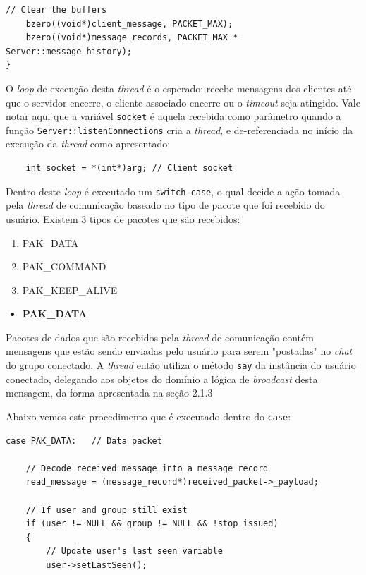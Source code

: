 \documentclass{article}
\begin{document}
\begin{itemize}
\begin{lstlisting}[xleftmargin=-.2\textwidth, xrightmargin=-.2\textwidth]
    // Clear the buffers
    bzero((void*)client_message, PACKET_MAX);
    bzero((void*)message_records, PACKET_MAX * Server::message_history);
}
\end{lstlisting}
\par O \textit{loop} de execução desta \textit{thread} é o esperado: recebe mensagens dos clientes até que o servidor encerre, o cliente associado encerre ou o \textit{timeout} seja atingido. Vale notar aqui que a variável \texttt{socket} é aquela recebida como parâmetro quando a função \texttt{Server::listenConnections} cria a \textit{thread}, e de-referenciada no início da execução da \textit{thread} como apresentado:
\begin{lstlisting}
    int socket = *(int*)arg; // Client socket
\end{lstlisting}
\par Dentro deste \textit{loop} é executado um \texttt{switch-case}, o qual decide a ação tomada pela \textit{thread} de comunicação baseado no tipo de pacote que foi recebido do usuário. Existem 3 tipos de pacotes que são recebidos:
\begin{enumerate}
    \item PAK\_DATA
    \item PAK\_COMMAND
    \item PAK\_KEEP\_ALIVE
\end{enumerate}
%
\begin{itemize}
    \item \textbf{PAK\_DATA}
\end{itemize}
\par Pacotes de dados que são recebidos pela \textit{thread} de comunicação contém mensagens que estão sendo enviadas pelo usuário para serem "postadas" no \textit{chat} do grupo conectado. A \textit{thread} então utiliza o método \texttt{say} da instância do usuário conectado, delegando aos objetos do domínio a lógica de \textit{broadcast} desta mensagem, da forma apresentada na seção 2.1.3
\par Abaixo vemos este procedimento que é executado dentro do \texttt{case}:
\begin{lstlisting}[xleftmargin=-.1\textwidth, xrightmargin=-.1\textwidth]
case PAK_DATA:   // Data packet

    // Decode received message into a message record
    read_message = (message_record*)received_packet->_payload;

    // If user and group still exist
    if (user != NULL && group != NULL && !stop_issued)
    {
        // Update user's last seen variable
        user->setLastSeen();


\end{lstlisting}
\end{itemize}
\end{document}
